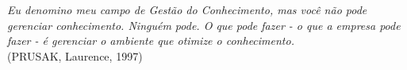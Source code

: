 
\renewcommand{\epigraphname}{EPÍGRAFE}

\begin{epigrafe}

\textit{Eu denomino meu campo de Gestão do Conhecimento, mas você não pode gerenciar conhecimento. Ninguém pode. O que pode fazer - o que a empresa pode fazer - é gerenciar o ambiente que otimize o conhecimento.}
\\  \hspace*{\fill} (PRUSAK, Laurence, 1997)

\end{epigrafe}

